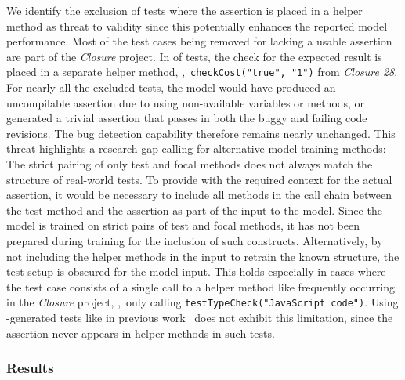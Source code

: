 We identify the exclusion of tests where the assertion is placed in a
helper method as threat to validity since this potentially enhances
the reported model performance.
Most of the test cases being removed for lacking a usable assertion
are part of the \emph{Closure} project. In
\dfjAssertionLocationInHelperClosure of \dfjTestsInProjectClosure
tests, the check for the expected result is placed in a separate helper
method, \eg,~\verb|checkCost("true", "1")| from \emph{Closure 28}.
For nearly all the excluded tests, the model would have produced an
uncompilable assertion due to using non-available variables or
methods, or generated a trivial assertion that passes in both the
buggy and failing code revisions. The bug detection capability
therefore remains nearly unchanged.
This threat highlights a research gap calling for alternative model
training methods: The strict pairing of only test and focal methods
does not always match the structure of real-world tests.
To provide \assertfive with the required context for the actual
assertion, it would be necessary to include all methods in the call
chain between the test method and the assertion as part of the input
to the model. Since the \assertfive model is trained on strict pairs
of test and focal methods, it has not been prepared during training
for the inclusion of such constructs.
Alternatively, by not including the helper methods in the input to
retrain the known structure, the test setup is obscured for the model
input. This holds especially in cases where the test case consists of
a single call to a helper method like frequently occurring in the
\emph{Closure} project, \eg,~only calling
\verb|testTypeCheck("JavaScript code")|.
Using \evosuite-generated tests like in previous
work~\cite{Dinella2022,Tufano2022} does not exhibit this limitation,
since the assertion never appears in helper methods in such tests.


\subsubsection{Results}



